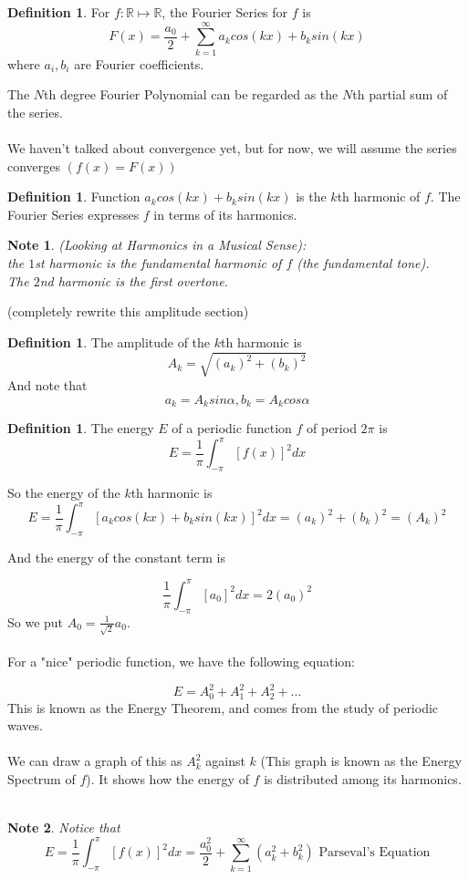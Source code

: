 \documentclass[12pt]{article}
\theoremstyle{plain}
\newtheorem*{note}{Note}
\theoremstyle{definition}
\newtheorem{definition}[theorem]{Definition}
\begin{document}
\begin{definition}
    For $f:\mathbb{R}\mapsto\mathbb{R}$, the Fourier Series for $f$ is
    $$F(x) = \frac{a_0}{2}+ \sum^\infty_{k=1} a_k cos(kx) + b_k sin(kx)$$
    where $a_i, b_i$ are Fourier coefficients.
\end{definition}

The $N$th degree Fourier Polynomial can be regarded as the $N$th partial sum of the series.\\
\\
We haven't talked about convergence yet, but for now, we will assume the series converges $(f(x)=F(x))$

\begin{definition}
    Function $a_k cos(kx) + b_k sin(kx)$ is the $k$th harmonic of $f$. The Fourier Series expresses $f$ in terms of its harmonics.
\end{definition}

\begin{note}
    (Looking at Harmonics in a Musical Sense):\\
    the $1$st harmonic is the fundamental harmonic of $f$ (the fundamental tone).\\
    The $2$nd harmonic is the first overtone.
\end{note}

(completely rewrite this amplitude section)

\begin{definition}
    The amplitude of the $k$th harmonic is
    $$A_k = \sqrt{(a_k)^2 + (b_k)^2}$$
    And note that
    $$a_k = A_k sin\alpha, b_k = A_k cos\alpha$$
\end{definition}

\begin{definition}
    The energy $E$ of a periodic function $f$ of period $2\pi$ is
    $$E = \frac{1}{\pi} \int^\pi_{-\pi} [f(x)]^2 dx$$
\end{definition}

So the energy of the $k$th harmonic is
$$E = \frac{1}{\pi} \int^\pi_{-\pi} [a_k cos(kx) + b_k sin(kx)]^2 dx = (a_k)^2 + (b_k)^2 = (A_k)^2$$

And the energy of the constant term is

$$\frac{1}{\pi} \int^\pi_{-\pi} [a_0]^2 dx = 2(a_0)^2$$
So we put $A_0 = \frac{1}{\sqrt{2}} a_0$.\\
\\
For a "nice" periodic function, we have the following equation:

$$E = A_0^2 + A_1^2 + A_2^2 + ...$$
This is known as the Energy Theorem, and comes from the study of periodic waves.\\
\\
We can draw a graph of this as $A_k^2$ against $k$ (This graph is known as the Energy Spectrum of $f$). It shows how the energy of $f$ is distributed among its harmonics.\\
\\
\begin{note}
    Notice that
    $$E = \frac{1}{\pi} \int^\pi_{-\pi} [f(x)]^2 dx = \frac{a_0^2}{2}+ \sum^\infty_{k=1} (a_k^2 + b_k^2) \text{ Parseval's Equation}$$
\end{note}
\end{document}
